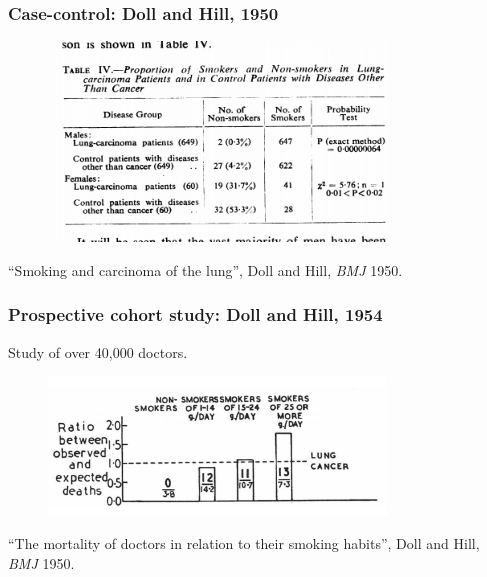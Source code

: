 \documentclass[handout]{beamer}
\begin{document}
\begin{frame}
	\frametitle{Case-control: Doll and Hill, 1950}
	
	\begin{figure}[ht]
		\centerline{\includegraphics[width=0.8\textwidth]{../figures/doll_hill_table}}
	\end{figure}
	\footnotesize ``Smoking and carcinoma of the lung'', Doll and Hill, \textit{BMJ} 1950.
\end{frame}

\begin{frame}
	\frametitle{Prospective cohort study: Doll and Hill, 1954}
	
	Study of over 40,000 doctors.
	
	\begin{figure}[ht]
		\centerline{\includegraphics[width=0.8\textwidth]{../figures/doll_hill_1954.pdf}}
	\end{figure}
	
	\footnotesize ``The mortality of doctors in relation to their smoking habits'', Doll and Hill, \textit{BMJ} 1950.
	
\end{frame}
\end{document}
